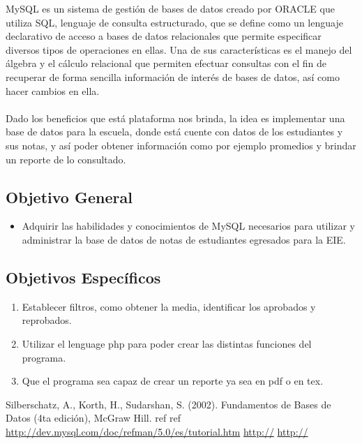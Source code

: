 \documentclass[12pt,journal,compsoc]{article}
\begin{document}
MySQL es un sistema de gestión de bases de datos creado por ORACLE que utiliza SQL, lenguaje de consulta estructurado, que se define como un lenguaje declarativo de acceso a bases de datos relacionales que permite especificar diversos tipos de operaciones en ellas. Una de sus características es el manejo del álgebra y el cálculo relacional que permiten efectuar consultas con el fin de recuperar de forma sencilla información de interés de bases de datos, así como hacer cambios en ella.\\\\
Dado los beneficios que está plataforma nos brinda, la idea es implementar una base de datos para la escuela, donde está cuente con datos de los estudiantes y sus notas, y así poder obtener información como por ejemplo promedios y brindar un reporte de lo consultado.
\subsection*{Objetivo General}
\begin{itemize}
\item Adquirir las habilidades y conocimientos de MySQL necesarios para utilizar y administrar la base de datos de notas de estudiantes egresados para la EIE.
\end{itemize}
\subsection*{Objetivos Específicos}
\begin{enumerate}
\item Establecer filtros, como obtener la media, identificar los aprobados y reprobados.
\item Utilizar el lenguage php para poder crear las distintas funciones del programa.
\item Que el programa sea capaz de crear un reporte ya sea en pdf o en tex.
\end{enumerate}
\begin{thebibliography}{6}
 Silberschatz, A., Korth, H., Sudarshan, S. (2002). Fundamentos de Bases de Datos (4ta edición), McGraw Hill.
ref
ref
\bibitem{}\url{http://dev.mysql.com/doc/refman/5.0/es/tutorial.htm}
\url{http://}
\bibitem{}\url{http://}
\end{thebibliography}
\end{document}
